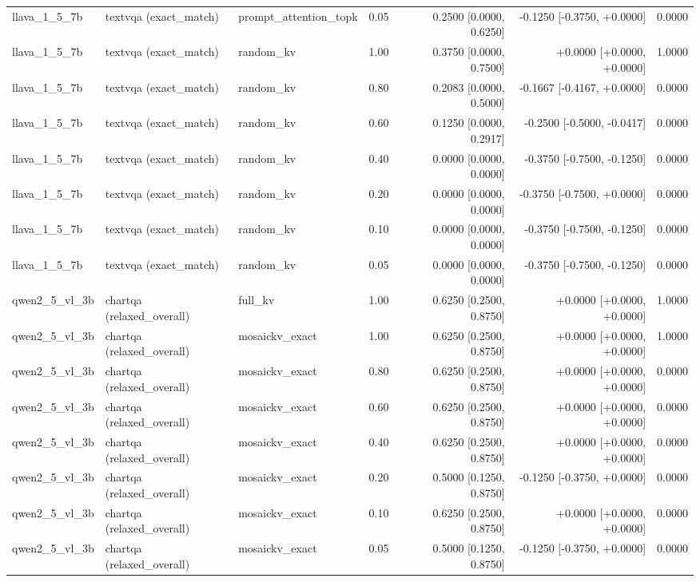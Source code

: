 \begin{longtable}{lllrrrr}
llava\_1\_5\_7b & textvqa (exact\_match) & prompt\_attention\_topk & 0.05 & 0.2500 [0.0000, 0.6250] & -0.1250 [-0.3750, +0.0000] & 0.0000 \\
llava\_1\_5\_7b & textvqa (exact\_match) & random\_kv & 1.00 & 0.3750 [0.0000, 0.7500] & +0.0000 [+0.0000, +0.0000] & 1.0000 \\
llava\_1\_5\_7b & textvqa (exact\_match) & random\_kv & 0.80 & 0.2083 [0.0000, 0.5000] & -0.1667 [-0.4167, +0.0000] & 0.0000 \\
llava\_1\_5\_7b & textvqa (exact\_match) & random\_kv & 0.60 & 0.1250 [0.0000, 0.2917] & -0.2500 [-0.5000, -0.0417] & 0.0000 \\
llava\_1\_5\_7b & textvqa (exact\_match) & random\_kv & 0.40 & 0.0000 [0.0000, 0.0000] & -0.3750 [-0.7500, -0.1250] & 0.0000 \\
llava\_1\_5\_7b & textvqa (exact\_match) & random\_kv & 0.20 & 0.0000 [0.0000, 0.0000] & -0.3750 [-0.7500, +0.0000] & 0.0000 \\
llava\_1\_5\_7b & textvqa (exact\_match) & random\_kv & 0.10 & 0.0000 [0.0000, 0.0000] & -0.3750 [-0.7500, -0.1250] & 0.0000 \\
llava\_1\_5\_7b & textvqa (exact\_match) & random\_kv & 0.05 & 0.0000 [0.0000, 0.0000] & -0.3750 [-0.7500, -0.1250] & 0.0000 \\
qwen2\_5\_vl\_3b & chartqa (relaxed\_overall) & full\_kv & 1.00 & 0.6250 [0.2500, 0.8750] & +0.0000 [+0.0000, +0.0000] & 1.0000 \\
qwen2\_5\_vl\_3b & chartqa (relaxed\_overall) & mosaickv\_exact & 1.00 & 0.6250 [0.2500, 0.8750] & +0.0000 [+0.0000, +0.0000] & 1.0000 \\
qwen2\_5\_vl\_3b & chartqa (relaxed\_overall) & mosaickv\_exact & 0.80 & 0.6250 [0.2500, 0.8750] & +0.0000 [+0.0000, +0.0000] & 0.0000 \\
qwen2\_5\_vl\_3b & chartqa (relaxed\_overall) & mosaickv\_exact & 0.60 & 0.6250 [0.2500, 0.8750] & +0.0000 [+0.0000, +0.0000] & 0.0000 \\
qwen2\_5\_vl\_3b & chartqa (relaxed\_overall) & mosaickv\_exact & 0.40 & 0.6250 [0.2500, 0.8750] & +0.0000 [+0.0000, +0.0000] & 0.0000 \\
qwen2\_5\_vl\_3b & chartqa (relaxed\_overall) & mosaickv\_exact & 0.20 & 0.5000 [0.1250, 0.8750] & -0.1250 [-0.3750, +0.0000] & 0.0000 \\
qwen2\_5\_vl\_3b & chartqa (relaxed\_overall) & mosaickv\_exact & 0.10 & 0.6250 [0.2500, 0.8750] & +0.0000 [+0.0000, +0.0000] & 0.0000 \\
qwen2\_5\_vl\_3b & chartqa (relaxed\_overall) & mosaickv\_exact & 0.05 & 0.5000 [0.1250, 0.8750] & -0.1250 [-0.3750, +0.0000] & 0.0000 \\

\end{longtable}
